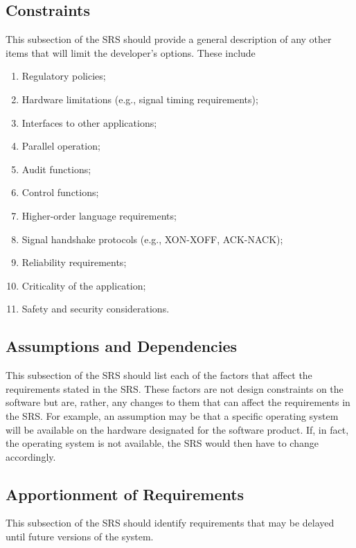 \documentclass[draftclsnofoot,onecolumn,10pt]{IEEEtran}
\begin{document}
\subsection{Constraints}
This subsection of the SRS should provide a general description of any other
items that will limit the developer's options. These include
\begin{enumerate}
	\item Regulatory policies;
	\item Hardware limitations (e.g., signal timing requirements);
	\item Interfaces to other applications;
	\item Parallel operation;
	\item Audit functions;
	\item Control functions;
	\item Higher-order language requirements;
	\item Signal handshake protocols (e.g., XON-XOFF, ACK-NACK);
	\item Reliability requirements;
	\item Criticality of the application;
	\item Safety and security considerations.
\end{enumerate}

\subsection{Assumptions and Dependencies}
This subsection of the SRS should list each of the factors that affect the
requirements stated in the SRS. These factors are not design constraints on the
software but are, rather, any changes to them that can affect the requirements
in the SRS. For example, an assumption may be that a specific operating system
will be available on the hardware designated for the software product. If, in
fact, the operating system is not available, the SRS would then have to change
accordingly.

\subsection{Apportionment of Requirements}
This subsection of the SRS should identify requirements that may be delayed
until future versions of the system.
\end{document}
